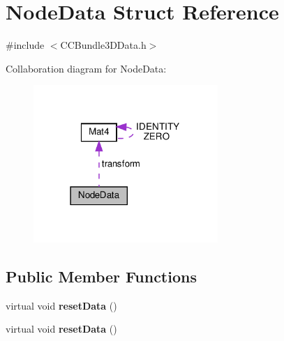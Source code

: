 \hypertarget{structNodeData}{}\section{Node\+Data Struct Reference}
\label{structNodeData}


{\ttfamily \#include $<$C\+C\+Bundle3\+D\+Data.\+h$>$}



Collaboration diagram for Node\+Data\+:
\nopagebreak
\begin{figure}[H]
\begin{center}
\leavevmode
\includegraphics[width=198pt]{structNodeData__coll__graph}
\end{center}
\end{figure}
\subsection*{Public Member Functions}
\begin{DoxyCompactItemize}
\item 
\mbox{\label{structNodeData_a793bdb3c23350ede596fd407adae9b74}} 
virtual void {\bfseries reset\+Data} ()
\item 
\mbox{\label{structNodeData_a793bdb3c23350ede596fd407adae9b74}} 
virtual void {\bfseries reset\+Data} ()
\end{DoxyCompactItemize}
